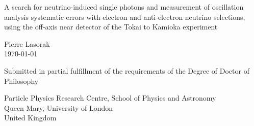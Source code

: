 \begin{titlepage}
  \begin{center}

    \vspace*{1cm}

    \Huge{A search for neutrino-induced single photons and measurement
of oscillation analysis systematic errors with electron and
anti-electron neutrino selections, using the off-axis near detector of
the Tokai to Kamioka experiment}
    
    \vspace{1.5cm}

    \LARGE{Pierre Lasorak \\ \today}
        
    \vfill

    \large{Submitted in partial fulfillment of the requirements of the
Degree of Doctor of Philosophy}

    \vspace{2.8cm}

    {\normalsize Particle Physics Research Centre, School of Physics
and Astronomy\\ Queen Mary, University of London\\ United Kingdom\\ }
        
  \end{center}
\end{titlepage}
